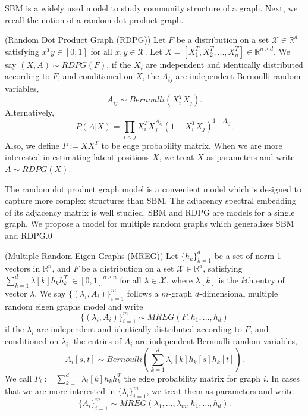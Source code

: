 \documentclass[10pt,journal,compsoc]{IEEEtran}
\newenvironment{definition}[1][Definition]{\begin{trivlist}
		\item[\hskip \labelsep {\bfseries #1}]}{\end{trivlist}}
\begin{document}
\noindent SBM is a widely used model to study community structure of a graph\cite{karrer2011stochastic}\cite{lyzinski2015community}. Next, we recall the notion of a random dot product graph\cite{young2007random}. 

\begin{definition} (Random Dot Product Graph (RDPG)) Let $F$ be a distribution on a set $\mathcal{X} \in \mathbb{R}^d$ satisfying $x^T y \in [0, 1]$ for all $x, y \in \mathcal{X}$. Let $X=[X_1^T,X_2^T,...,X_n^T] \in \mathbb{R}^{n \times d}$. We say $(X,A) \sim RDPG(F)$, if the $X_i$ are independent and identically distributed according to $F$, and conditioned on $X$, the $A_{ij}$ are independent Bernoulli random variables,
\[ A_{ij} \sim Bernoulli(X_i^T X_j). \]
Alternatively,
\[ P(A|X) = \prod_{i<j} X_i^T X_j ^{ A_{ij}} (1-X_i^T X_j)^{1- A_{ij}}.\]
Also, we define $P:=XX^T$ to be edge probability matrix. When we are more interested in estimating latent positions $X$, we treat $X$ as parameters and write $A \sim RDPG(X)$.
\end{definition}
The random dot product graph model is a convenient model which is designed to capture more complex structures than SBM. The adjacency
spectral embedding of its adjacency matrix is well studied\cite{sussman2014consistent}. SBM and RDPG are models for a single graph. We propose a model for multiple random graphs which generalizes SBM and RDPG.0
\begin{definition} (Multiple Random Eigen Graphs (MREG)) Let $\{h_k\}_{k=1}^{d}$ be a set of norm-1 vectors in $\mathbb{R}^{n}$, and  $F$ be a distribution on a set $\mathcal{X} \in \mathbb{R}^d$,  satisfying $\sum\limits_{k=1}^{d} \lambda [k] h_k  h_k^T \  \in [0, 1]^{n \times n} $ for all $\lambda \in \mathcal{X}$, where $\lambda[k]$ is the $k$th entry of vector $\lambda$. We say $\{(\lambda_i,A_i)\}_{i=1}^{m}$ follows a $m$-graph $d$-dimensional multiple random eigen graphs model and write
\[\{(\lambda_i,A_i)\}_{i=1}^{m} \sim MREG(F,h_1,...,h_d)\]
if the $\lambda_i$ are independent and identically distributed according to $F$, and conditioned on $\lambda_i$, the entries of $A_i$ are independent Bernoulli random variables,
\[ A_{i}[s,t] \sim Bernoulli( \sum_{k=1}^{d} \lambda_{i}[k] h_{k} [s] h_{k} [t] ). \]
We call $P_i:=\sum_{k=1}^{d} \lambda_i [k] h_k  h_k^T$ the edge probability matrix for graph $i$. In cases that we are more interested in $\{\lambda_i\}_{i=1}^m$, we treat them as parameters and write 
\[\{A_i\}_{i=1}^{m} \sim MREG(\lambda_1,...,\lambda_m,h_1,...,h_d).\] 
\end{definition}
\end{document}
